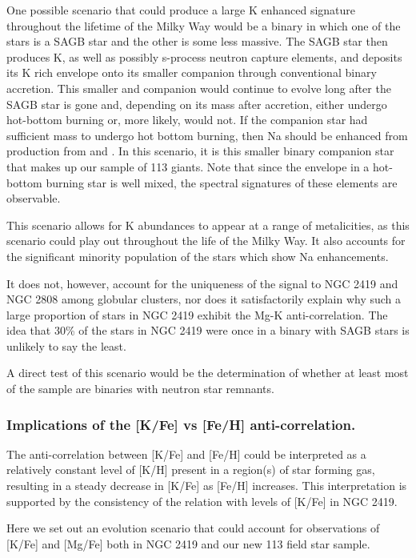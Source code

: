 \documentclass[a4paper,fleqn,usenatbib]{mnras}
\begin{document}
One possible scenario that could produce a large K enhanced signature throughout the lifetime of the Milky Way would be a binary in which one of the stars is a SAGB star and the other is some less massive. The SAGB star then produces K, as well as possibly s-process neutron capture elements, and deposits its K rich envelope onto its smaller companion through conventional binary accretion. This smaller and companion would continue to evolve long after the SAGB star is gone and, depending on its mass after accretion, either undergo hot-bottom burning or, more likely, would not. If the companion star had sufficient mass to undergo hot bottom burning, then Na should be enhanced from production from  and . In this scenario, it is this smaller binary companion star that makes up our sample of 113 giants. Note that since the envelope in a hot-bottom burning star is well mixed, the spectral signatures of these elements are observable.

This scenario allows for K abundances to appear at a range of metalicities, as this scenario could play out throughout the life of the Milky Way. It also  accounts for the significant minority population of the stars which show Na enhancements.

It does not, however, account for the uniqueness of the signal to NGC 2419 and NGC 2808 among globular clusters, nor does it satisfactorily explain why such a large proportion of stars in NGC 2419 exhibit the Mg-K anti-correlation. The idea that 30\% of the stars in NGC 2419 were once in a binary with SAGB stars is unlikely to say the least. 

A direct test of this scenario would be the determination of whether at least most of the sample are binaries with neutron star remnants.

\subsubsection{Implications of the [K/Fe] vs [Fe/H] anti-correlation.}

The anti-correlation between [K/Fe] and [Fe/H] could be interpreted as a relatively constant level of [K/H] present in a region(s) of star forming gas, resulting in a steady decrease in [K/Fe] as [Fe/H] increases. This interpretation is supported by the consistency of the relation with levels of [K/Fe] in NGC 2419.

Here we set out an evolution scenario that could account for observations of [K/Fe] and [Mg/Fe] both in NGC 2419 and our new 113 field star sample.
\end{document}
